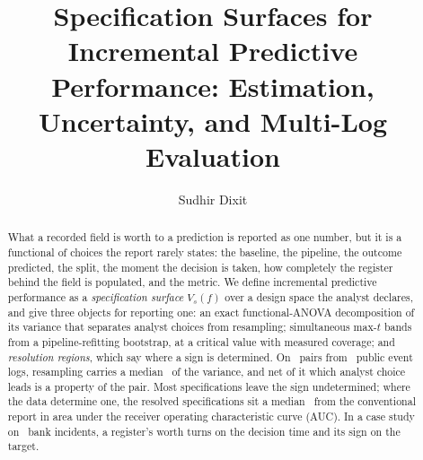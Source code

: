 \documentclass[preprint,12pt,authoryear]{elsarticle}
\theoremstyle{definition}
\newif\ifblind
\begin{document}
\begin{frontmatter}

\title{Specification Surfaces for Incremental Predictive Performance:
Estimation, Uncertainty, and Multi-Log Evaluation}

\ifblind\else
\author[ind]{Sudhir Dixit}
\address[ind]{Independent Researcher, \affiliationStreet, \affiliationCity, \affiliationRegion, \affiliationCountry}
\fi

\begin{abstract}
What a recorded field is worth to a prediction is reported as one number, but
it is a functional of choices the report rarely states: the baseline,
the pipeline, the outcome predicted, the split, the moment the decision is
taken, how completely the register behind the field is populated, and the
metric. We define incremental predictive performance as a \emph{specification
surface} $V_s(f)$ over a design space the analyst declares, and give three
objects for reporting one: an exact functional-ANOVA decomposition of its
variance that separates analyst choices from resampling; simultaneous
max-$t$ bands from a pipeline-refitting bootstrap, at a critical value with
measured coverage; and
\emph{resolution regions}, which say where a sign is determined. On
\nPairs\ pairs from \nLogs\ public event logs, resampling carries a median
\shareResamplingStratumPct\ of the variance, and net of it which analyst
choice leads is a property of the pair. Most specifications leave the sign
undetermined; where the data determine one, the resolved specifications sit a
median \madResolvedMedian\ from the conventional report in area under the
receiver operating characteristic curve (AUC). In a case study on \nCohort\ bank incidents, a register's
worth turns on the decision time and its sign on the target.
\end{abstract}


\end{frontmatter}
\end{document}

